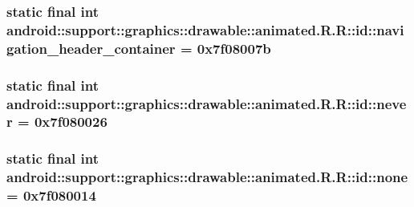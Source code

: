 \hypertarget{classandroid_1_1support_1_1graphics_1_1drawable_1_1animated_1_1_r_1_1id_c730bf62deeeb3c783b36ceac94d832c}{
\subsubsection[{navigation\_\-header\_\-container}]{\setlength{\rightskip}{0pt plus 5cm}static final int android::support::graphics::drawable::animated.R.R::id::navigation\_\-header\_\-container = 0x7f08007b}}
\label{classandroid_1_1support_1_1graphics_1_1drawable_1_1animated_1_1_r_1_1id_c730bf62deeeb3c783b36ceac94d832c}


\hypertarget{classandroid_1_1support_1_1graphics_1_1drawable_1_1animated_1_1_r_1_1id_e0fdaed641cb35a600bd33aee96e221e}{
\subsubsection[{never}]{\setlength{\rightskip}{0pt plus 5cm}static final int android::support::graphics::drawable::animated.R.R::id::never = 0x7f080026}}
\label{classandroid_1_1support_1_1graphics_1_1drawable_1_1animated_1_1_r_1_1id_e0fdaed641cb35a600bd33aee96e221e}


\hypertarget{classandroid_1_1support_1_1graphics_1_1drawable_1_1animated_1_1_r_1_1id_f14b14c2a10da3754d1a894969962d1e}{
\subsubsection[{none}]{\setlength{\rightskip}{0pt plus 5cm}static final int android::support::graphics::drawable::animated.R.R::id::none = 0x7f080014}}
\label{classandroid_1_1support_1_1graphics_1_1drawable_1_1animated_1_1_r_1_1id_f14b14c2a10da3754d1a894969962d1e}


